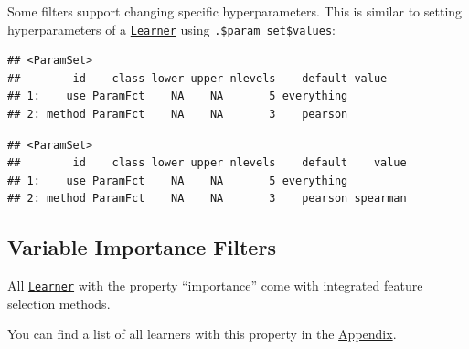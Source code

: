 \documentclass[
]{scrbook}
\newenvironment{Shaded}{\begin{snugshade}}{\end{snugshade}}
\newcommand{\AttributeTok}[1]{\textcolor[rgb]{0.77,0.63,0.00}{#1}}
\newcommand{\CommentTok}[1]{\textcolor[rgb]{0.56,0.35,0.01}{\textit{#1}}}
\newcommand{\FunctionTok}[1]{\textcolor[rgb]{0.00,0.00,0.00}{#1}}
\newcommand{\NormalTok}[1]{#1}
\newcommand{\OtherTok}[1]{\textcolor[rgb]{0.56,0.35,0.01}{#1}}
\newcommand{\SpecialCharTok}[1]{\textcolor[rgb]{0.00,0.00,0.00}{#1}}
\newcommand{\StringTok}[1]{\textcolor[rgb]{0.31,0.60,0.02}{#1}}
\renewenvironment{Shaded} {\begin{snugshade}\small} {\end{snugshade}}
\begin{document}
Some filters support changing specific hyperparameters.
This is similar to setting hyperparameters of a \href{https://mlr3.mlr-org.com/reference/Learner.html}{\texttt{Learner}} using \texttt{.\$param\_set\$values}:

\begin{Shaded}
\end{Shaded}

\begin{verbatim}
## <ParamSet>
##        id    class lower upper nlevels    default value
## 1:    use ParamFct    NA    NA       5 everything      
## 2: method ParamFct    NA    NA       3    pearson
\end{verbatim}

\begin{Shaded}
\end{Shaded}

\begin{verbatim}
## <ParamSet>
##        id    class lower upper nlevels    default    value
## 1:    use ParamFct    NA    NA       5 everything         
## 2: method ParamFct    NA    NA       3    pearson spearman
\end{verbatim}

\hypertarget{fs-var-imp-filters}{%
\subsection{Variable Importance Filters}\label{fs-var-imp-filters}}

All \href{https://mlr3.mlr-org.com/reference/Learner.html}{\texttt{Learner}} with the property ``importance'' come with integrated feature selection methods.

You can find a list of all learners with this property in the \protect\hyperlink{fs-filter-embedded-list}{Appendix}.
\end{document}

